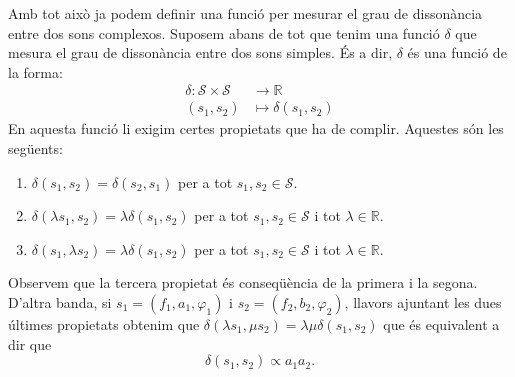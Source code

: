 \documentclass{article}
\theoremstyle{definition}
\newcommand{\0}{\ensuremath{\vb{0}}}
\newcommand{\RR}{\ensuremath{\mathbb{R}}} %
\begin{document}
Amb tot això ja podem definir una funció per mesurar el grau de dissonància entre dos sons complexos. Suposem abans de tot que tenim una funció $\delta$ que mesura el grau de dissonància entre dos sons simples. És a dir, $\delta$ és una funció de la forma:
\begin{align*}
    \delta:\mathcal{S}\times\mathcal{S}&\longrightarrow\RR\\
    (s_1,s_2)&\longmapsto\delta(s_1,s_2)
\end{align*}
En aquesta funció li exigim certes propietats que ha de complir. Aquestes són les següents:
\begin{enumerate}[label=$\delta$\arabic*),ref=$\delta$\arabic*]
    \item\label{delta1} $\delta(s_1,s_2)=\delta(s_2,s_1)$ per a tot $s_1,s_2\in\mathcal{S}$.
    \item\label{delta2} $\delta(\lambda s_1,s_2)=\lambda\delta(s_1,s_2)$ per a tot $s_1,s_2\in\mathcal{S}$ i tot $\lambda\in\RR$.
    \item\label{delta3} $\delta(s_1,\lambda s_2)=\lambda\delta(s_1,s_2)$ per a tot $s_1,s_2\in\mathcal{S}$ i tot $\lambda\in\RR$.\par
\end{enumerate}
Observem que la tercera propietat és conseqüència de la primera i la segona. D'altra banda, si $s_1=(f_1,a_1,\varphi_1)$ i $s_2=(f_2,b_2,\varphi_2)$, llavors ajuntant les dues últimes propietats obtenim que $\delta(\lambda s_1,\mu s_2)=\lambda\mu\delta(s_1,s_2)$ que és equivalent a dir que $$\delta(s_1,s_2)\propto a_1a_2.$$ 
\end{document}
